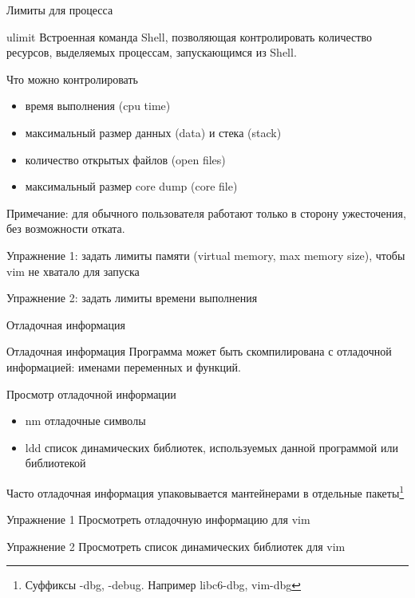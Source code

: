  




\firstframe

\begin{frame}{Лимиты для процесса}
  \begin{block}{\alert{ulimit}}
    Встроенная команда Shell, позволяющая контролировать количество ресурсов, выделяемых процессам, запускающимся из Shell.
  \end{block} \pause

  \begin{block}{Что можно контролировать}
    \begin{itemize}
      \item время выполнения (cpu time)
      \item максимальный размер данных (data) и стека (stack)
      \item количество открытых файлов (open files)
      \item максимальный размер core dump (core file)
    \end{itemize}
  \end{block} 
  Примечание: для обычного пользователя работают только в сторону ужесточения, без возможности отката.
  \pause

  \alert{Упражнение 1}: задать лимиты памяти (virtual memory, max memory size), чтобы vim не хватало для запуска

  \alert{Упражнение 2}: задать лимиты времени выполнения

\end{frame}

\begin{frame}{Отладочная информация}
  \label{debug-info}
  \begin{block}{Отладочная информация}
    Программа может быть скомпилирована с отладочной информацией: именами переменных и функций.
  \end{block}

  \begin{block}{Просмотр отладочной информации}
    \begin{itemize}
      \item \alert{nm} отладочные символы
      \item \alert{ldd} список динамических библиотек, используемых данной программой или библиотекой
    \end{itemize}
  \end{block} 

  Часто отладочная информация упаковывается мантейнерами в отдельные пакеты\footnote{Суффиксы -dbg, -debug. Например \alert{libc6-dbg, vim-dbg} }

  \alert{Упражнение 1} Просмотреть отладочную информацию для vim

  \alert{Упражнение 2} Просмотреть список динамических библиотек для vim
\end{frame}

